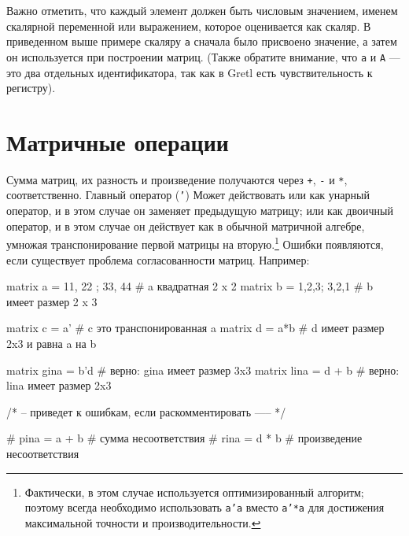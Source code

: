 Важно отметить, что каждый элемент должен быть числовым значением,
именем скалярной переменной или выражением, которое оценивается как
скаляр. В приведенном выше примере скаляру \texttt{a} сначала было
присвоено значение, а затем он используется при построении
матриц. (Также обратите внимание, что \texttt{a} и \texttt{A} --- это
два отдельных идентификатора, так как в Gretl есть чувствительность к
регистру).

\section{Матричные операции}
\label{sec:mat-op}

Сумма матриц, их разность и произведение получаются через \texttt{+},
\texttt{-} и \texttt{*}, соответственно. Главный оператор (\texttt{'})
Может действовать или как унарный оператор, и в этом случае он
заменяет предыдущую матрицу; или как двоичный оператор, и в этом
случае он действует как в обычной матричной алгебре, умножая
транспонирование первой матрицы на вторую.\footnote{Фактически, в этом
  случае используется оптимизированный алгоритм; поэтому всегда
  необходимо использовать \texttt{a'a} вместо \texttt{a'*a} для
  достижения максимальной точности и производительности.}  Ошибки
появляются, если существует проблема согласованности матриц. Например:
\begin{code}
  matrix a = {11, 22 ; 33, 44}  # a квадратная 2 x 2
  matrix b = {1,2,3; 3,2,1}     # b имеет размер 2 x 3

  matrix c = a'         # c это транспонированная a
  matrix d = a*b        # d имеет размер 2x3 и равна a на b

  matrix gina = b'd     # верно: gina имеет размер 3x3
  matrix lina = d + b   # верно: lina имеет размер 2x3

  /* -- приведет к ошибкам, если раскомментировать ----- */

  # pina = a + b  # сумма несоответствия
  # rina = d * b  # произведение несоответствия
\end{code}

